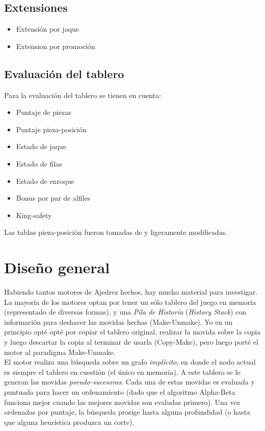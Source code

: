 \documentclass{article}
\begin{document}
\subsection{Extensiones}
\begin{itemize}
\item Extensión por jaque
\item Extension por promoción
\end{itemize}

\subsection{Evaluación del tablero}
Para la evaluación del tablero se tienen en cuenta:
\begin{itemize}
\item Puntaje de piezas
\item Puntaje pieza-posición
\item Estado de jaque
\item Estado de filas
\item Estado de enroque
\item Bonus por par de alfiles
\item King-safety
\end{itemize}

Las tablas pieza-posición fueron tomadas de \cite{piece-square-table} y ligeramente modificadas.\\

\section{Diseño general}

Habiendo tantos motores de Ajedrez hechos, hay mucho material para
investigar. La mayoría de los motores optan por tener un sólo tablero
del juego en memoria (representado de diversas formas), y una \emph
{Pila de Historia} (\emph {History Stack}) con información para
deshacer las movidas hechas (Make-Unmake). Yo en un principio opté
opté por copiar el tablero original, realizar la movida sobre la copia
y luego descartar la copia al terminar de usarla (Copy-Make), pero luego
porté el motor al paradigma Make-Unmake.
\\

El motor realiza una búsqueda sobre un grafo \emph{implícito},
en donde el nodo actual es siempre el tablero en cuestión (el
único en memoria). A este tablero se le generan las movidas
\emph{pseudo-sucesoras}. Cada una de estas movidas es evaluada y
puntuada para hacer un ordenamiento (dado que el algoritmo Alpha-Beta
funciona mejor cuando las mejores movidas son evaludas primero). Una vez
ordenadas por puntaje, la búsqueda prosige hasta alguna profundidad (o
hasta que alguna heurística produzca un corte).
\\
\end{document}
